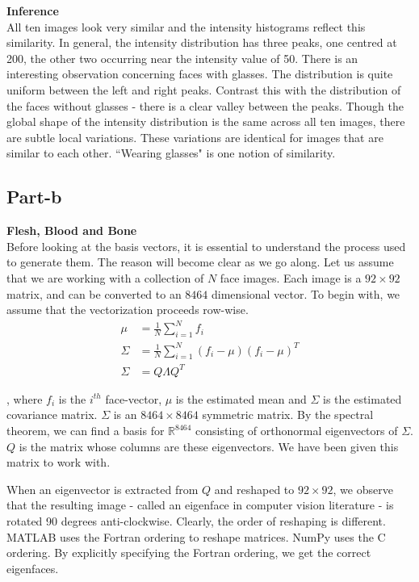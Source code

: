 \documentclass{article}
\begin{document}
\newpage


\textbf{Inference}\\
All ten images look very similar and the intensity histograms reflect this similarity. In general, the intensity distribution has three peaks, one centred at 200, the other two occurring near the intensity value of 50.
There is an interesting observation concerning faces with glasses. The distribution is quite uniform between the left and right peaks. Contrast this with the distribution of the faces without glasses - there is a clear valley between the peaks. Though the global shape of the intensity distribution is the same across all ten images, there are subtle local variations. These variations are identical for images that are similar to each other. ``Wearing glasses" is one notion of similarity.

\newpage
\subsection{Part-b}

\textbf{Flesh, Blood and Bone}\\

Before looking at the basis vectors, it is essential to understand the process used to generate them. The reason will become clear as we go along. Let us assume that we are working with a collection of $N$ face images. Each image is a $92 \times 92$ matrix, and can be converted to an $8464$ dimensional vector. To begin with, we assume that the  vectorization proceeds row-wise. 
\begin{align*}
\mu &= \frac{1}{N} \sum \limits_{i = 1}^{N} f_{i}\\
\Sigma &= \frac{1}{N} \sum \limits_{i = 1}^{N} (f_{i} - \mu)(f_{i} - \mu)^{T}\\
\Sigma &= Q \Lambda Q^{T}
\end{align*}

, where $f_i$ is the $i^{th}$ face-vector, $\mu$ is the estimated mean and $\Sigma$ is the estimated covariance matrix. $\Sigma$ is an $8464 \times 8464$ symmetric matrix. By the spectral theorem, we can find a basis for $\mathbb{R}^{8464}$ consisting of orthonormal eigenvectors of $\Sigma$. $Q$ is the matrix whose columns are these eigenvectors. We have been given this matrix to work with.

When an eigenvector is extracted from $Q$ and reshaped to $92 \times 92$, we observe that the resulting image - called an eigenface in computer vision literature - is rotated 90 degrees anti-clockwise. Clearly, the order of reshaping is different. MATLAB uses the Fortran ordering to reshape matrices. NumPy uses the C ordering. By explicitly specifying the Fortran ordering, we get the correct eigenfaces.
\end{document}
